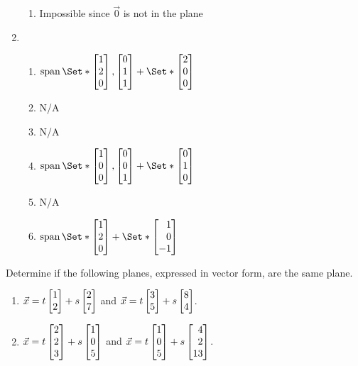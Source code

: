 \begin{exercises}
\begin{problist}
\begin{solution}
\begin{enumerate}
\begin{enumerate}
					\item Impossible since $\vec {0}$ is not in the plane
				    \end{enumerate}
				\item 
				    \begin{enumerate}
					\item $\Span\Set*{\mat{1\\2\\0}, \mat{0\\1\\1}} + \Set*{\mat{2\\0\\0}}$
					\item N/A
					\item N/A
					\item $\Span\Set*{\mat{1\\0\\0}, \mat{0\\0\\1}} + \Set*{\mat{0\\1\\0}}$
					\item N/A
					\item $\Span\Set*{\mat{1\\2\\0}} + \Set*{\mat{1\\0\\-1}}$
				    \end{enumerate}
			\end{enumerate}
		\end{solution}
		
		\prob Determine if the following planes, expressed in vector form, are the same plane.
		\begin{enumerate}
			\item $\vec x = t\mat{1\\2}+ s\mat{2\\7}$ and $\vec x =
				t\mat{3\\5}+ s\mat{8\\4}$.

			\item $\vec x = t\mat{2\\2\\3}+ s\mat{1\\0\\5}$ and $\vec
				x = t\mat{1\\0\\5}+ s\mat{4\\2\\13}$.


\end{enumerate}
\end{problist}
\end{exercises}
